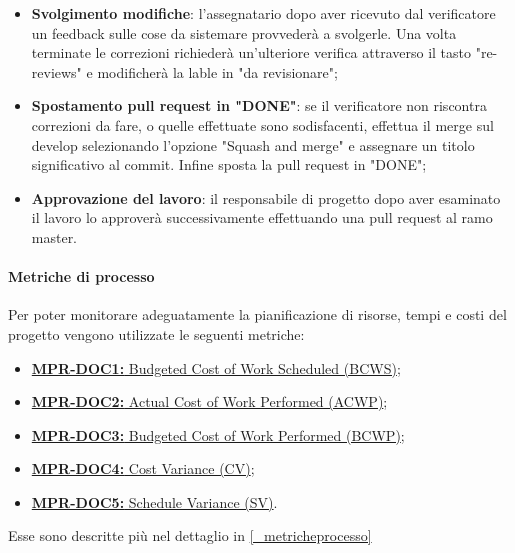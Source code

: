 \begin{itemize}
    \item \textbf{Svolgimento modifiche}: l'assegnatario dopo aver ricevuto dal verificatore un feedback sulle cose da sistemare provvederà a svolgerle. Una volta terminate le correzioni richiederà un'ulteriore verifica attraverso il tasto "re-reviews" e modificherà la lable in "da revisionare";
    \item \textbf{Spostamento pull request in "DONE"}: se il verificatore non riscontra correzioni da fare, o quelle effettuate sono sodisfacenti, effettua il merge sul develop selezionando l'opzione "Squash and merge" e assegnare un titolo significativo al commit. Infine sposta la pull request in "DONE";
    \item \textbf{Approvazione del lavoro}: il responsabile di progetto dopo aver esaminato il lavoro lo approverà successivamente effettuando una pull request al ramo master.
\end{itemize}
\paragraph{Metriche di processo}
Per poter monitorare adeguatamente la pianificazione di risorse, tempi e costi del progetto vengono utilizzate le seguenti metriche:
\begin{itemize}
    \item \hyperref[_MPR-DOC1]{\textbf{MPR-DOC1:} Budgeted Cost of Work Scheduled (BCWS)};
    \item \hyperref[_MPR-DOC2]{\textbf{MPR-DOC2:} Actual Cost of Work Performed (ACWP)};
    \item \hyperref[_MPR-DOC3]{\textbf{MPR-DOC3:} Budgeted Cost of Work Performed (BCWP)};
    \item \hyperref[_MPR-DOC4]{\textbf{MPR-DOC4:} Cost Variance (CV)};
    \item \hyperref[_MPR-DOC5]{\textbf{MPR-DOC5:} Schedule Variance (SV)}.
\end{itemize}
Esse sono descritte più nel dettaglio in \ref{_metricheprocesso}

